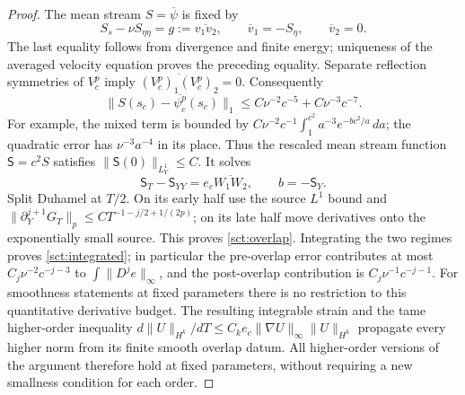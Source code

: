 \begin{proof}
The mean stream $S=\overline\psi$ is fixed by
\begin{equation}
 S_s-\nu S_{\eta\eta}=g:=\overline{v_1v_2},\qquad
 \overline v_1=-S_\eta,\qquad\overline v_2=0.
 \label{sct:mean}
\end{equation}
The last equality follows from divergence and finite energy; uniqueness
of the averaged velocity equation proves the preceding equality.
Separate reflection symmetries of $V_c^p$ imply
$\overline{(V_c^p)_1(V_c^p)_2}=0$. Consequently
\[
 \|S(s_c)-\overline{\psi_c^p}(s_c)\|_1
 \leq C\nu^{-2}c^{-5}+C\nu^{-3}c^{-7}.
\]
For example, the mixed term is bounded by
$C\nu^{-2}c^{-1}\int_1^{c^2}a^{-3}e^{-bc^2/a}\,da$;
the quadratic error has $\nu^{-3}a^{-4}$ in its place.
Thus the rescaled mean stream function $\mathsf S=c^2S$ satisfies
$\|\mathsf S(0)\|_{L^1_Y}\leq C$. It solves
\[
 \mathsf S_T-\mathsf S_{YY}=e_c\overline{W_1W_2},
 \qquad b=-\mathsf S_Y.
\]
Split Duhamel at $T/2$. On its early half use the source $L^1$ bound
and $\|\partial_Y^{j+1}G_T\|_p
\leq C T^{-1-j/2+1/(2p)}$; on its late half move derivatives
onto the exponentially small source. This proves \eqref{sct:overlap}.
Integrating the two regimes proves \eqref{sct:integrated}; in particular
the pre-overlap error contributes at most
$C_j\nu^{-2}c^{-j-3}$ to $\int\|D^je\|_\infty$,
and the post-overlap contribution is $C_j\nu^{-1}c^{-j-1}$.
For smoothness statements at fixed parameters there is no restriction
to this quantitative derivative budget. The resulting integrable
strain and the tame higher-order inequality
$d\|U\|_{H^k}/dT\leq C_ke_c\|\nabla U\|_\infty\|U\|_{H^k}$
propagate every higher norm from its finite smooth overlap datum.
All higher-order versions of the argument therefore hold at fixed
parameters, without requiring a new smallness condition for each order.
\end{proof}

